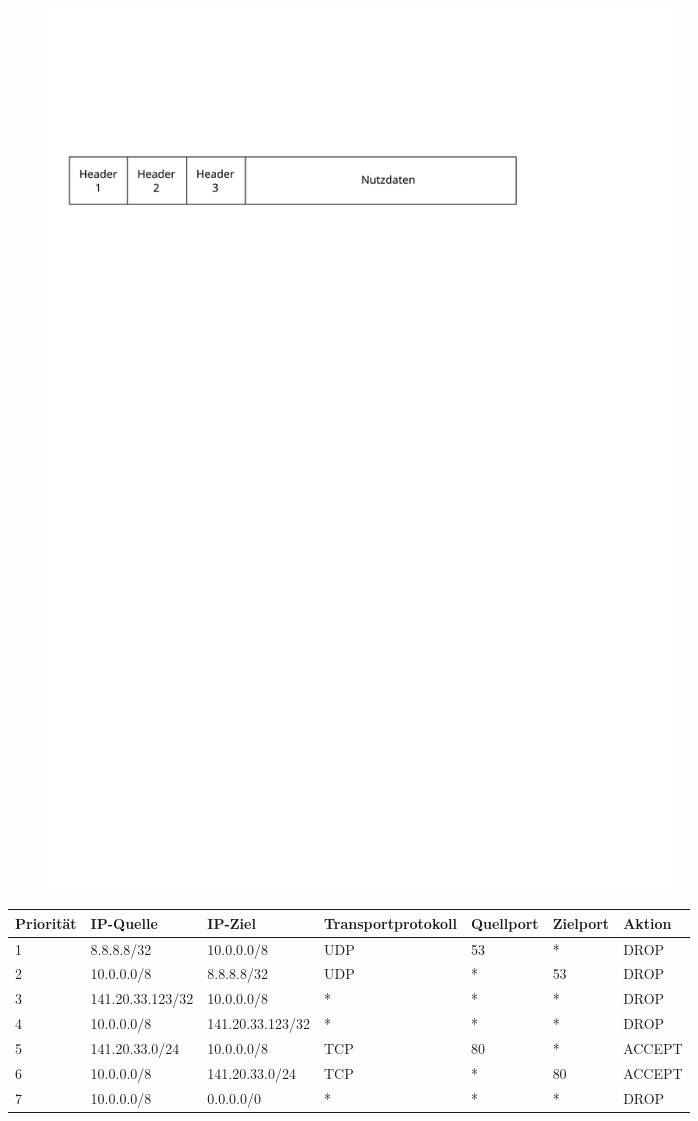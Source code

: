 \documentclass[xcolor=x11names,compress]{beamer}
\renewcommand{\(}{\begin{columns}}
\renewcommand{\)}{\end{columns}}
\newcommand{\<}[1]{\begin{column}{#1}}
\renewcommand{\>}{\end{column}}
\begin{document}
\begin{frame}
  \begin{figure}
  \centering
  \includegraphics[width=0.8\textwidth]{figures/paketheader}
  \end{figure}
  \pause
  \tiny
  \begin{table}
  \begin{tabular}
      {p{0.6cm}p{1.4cm}p{1.4cm}p{0.7cm}p{0.7cm}p{0.6cm}|p{0.7cm}}
    Priorität&IP-Quelle&IP-Ziel&Transport\-protokoll&Quellport&Zielport&Aktion\\
    \hline
    1&8.8.8.8/32&10.0.0.0/8&UDP&53&*&\textsc{DROP}\\
    2&10.0.0.0/8&8.8.8.8/32&UDP&*&53&\textsc{DROP}\\
    3&141.20.33.123/32&10.0.0.0/8&*&*&*&\textsc{DROP}\\
    4&10.0.0.0/8&141.20.33.123/32&*&*&*&\textsc{DROP}\\
    5&141.20.33.0/24&10.0.0.0/8&TCP&80&*&\textsc{ACCEPT}\\
    6&10.0.0.0/8&141.20.33.0/24&TCP&*&80&\textsc{ACCEPT}\\
    7&10.0.0.0/8&0.0.0.0/0&*&*&*&\textsc{DROP}
  \end{tabular}
  \end{table}
  \normalsize
\end{frame}
\end{document}
